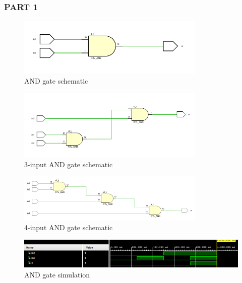 \documentclass[pdftex,12pt,a4paper]{article}
\begin{document}
\subsubsection{PART 1}
    \begin{figure}[H]
    	\centering
    	\includegraphics[width=0.8\textwidth]{schematic/and_schematic.png}	
    	\caption{AND gate schematic}
    	\label{AND gate schematic}
    \end{figure}
    
    \begin{figure}[H]
    	\centering
    	\includegraphics[width=0.8\textwidth]{schematic/three_and_schematic.png}	
    	\caption{3-input AND gate schematic}
    	\label{3-input AND gate schematic}
    \end{figure}
    
    \begin{figure}[H]
    	\centering
    	\includegraphics[width=0.8\textwidth]{schematic/four_and_schematic.png}	
    	\caption{4-input AND gate schematic}
    	\label{4-input AND gate schematic}
    \end{figure}
    
    \begin{figure}[H]
    	\centering
    	\includegraphics[width=1\textwidth]{simulations/and_sim.png}	
    	\caption{AND gate simulation}
    	\label{AND gate simulation}
    \end{figure}
    
\end{document}
